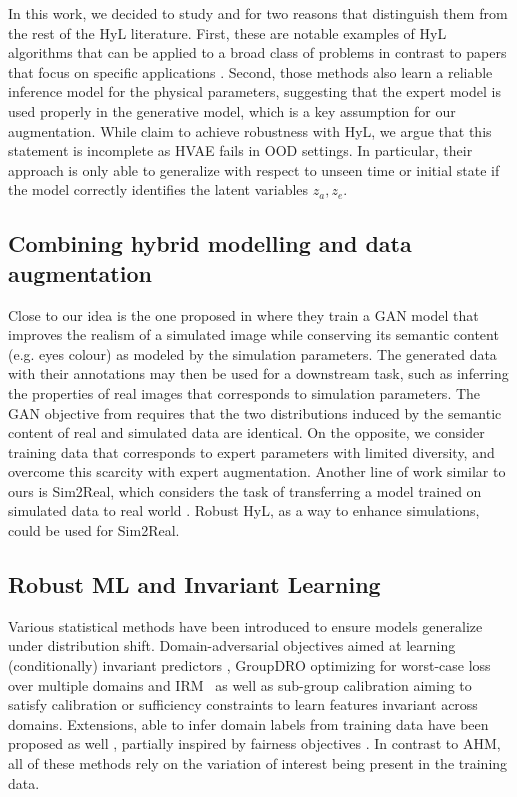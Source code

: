 \documentclass{article}
\begin{document}
In this work, we decided to study \citet{APHYNITY} and \citet{HVAE} for two reasons that distinguish them from the rest of the HyL literature. First, these are notable examples of HyL algorithms that can be applied to a broad class of problems in contrast to papers that focus on specific applications \citep{hl_2,hl_3}. Second, those methods also learn a reliable inference model for the physical parameters, suggesting that the expert model is used properly in the generative model, which is a key assumption for our augmentation. While \citet{HVAE} claim to achieve robustness with HyL, we argue that this statement is incomplete as HVAE fails in OOD settings. In particular, their approach is only able to generalize with respect to unseen time or initial state if the model correctly identifies the latent variables $z_a, z_e$. 

\subsection{Combining hybrid modelling and data augmentation}
Close to our idea is the one proposed in \citet{gan_hl} where they train a GAN model that improves the realism of a simulated image while conserving its semantic content (e.g. eyes colour) as modeled by the simulation parameters. The generated data with their annotations may then be used for a downstream task, such as inferring the properties of real images that corresponds to simulation parameters. The GAN objective from \citet{gan_hl} requires that the two distributions induced by the semantic content of real and simulated data are identical. On the opposite, we consider training data that corresponds to expert parameters with limited diversity, and overcome this scarcity with expert augmentation. Another line of work similar to ours is Sim2Real, which considers the task of transferring a model trained on simulated data to real world \citep{sim2real-1, sim2real-2, sim2real-3}. Robust HyL, as a way to enhance simulations, could be used for Sim2Real.

\subsection{Robust ML and Invariant Learning}
Various statistical methods have been introduced to ensure models generalize under distribution shift. Domain-adversarial objectives aimed at learning (conditionally) invariant predictors \citep{ganin2016domain,zhang2017aspect,li2018deep}, GroupDRO \citep{groupDRO_ICLR} optimizing for worst-case loss over multiple domains and IRM~\citep{IRM} as well as sub-group calibration \citep{wald2021calibration} aiming to satisfy calibration or sufficiency constraints to learn features invariant across domains. Extensions, able to infer domain labels from training data have been proposed as well \citep{lahoti2020fairness,creager2021environment}, partially inspired by fairness objectives \citep{hebert2018multicalibration,kim2019multiaccuracy}. In contrast to AHM, all of these methods rely on the variation of interest being present in the training data.
\end{document}
